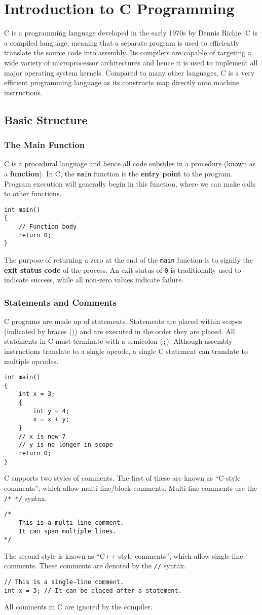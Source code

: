 \documentclass{article}
\begin{document}
\section{Introduction to C Programming}
C is a programming language developed in the early 1970s by Dennis
Richie. C is a compiled language, meaning that a separate program is
used to efficiently translate the source code into assembly. Its
compilers are capable of targeting a wide variety of microprocessor
architectures and hence it is used to implement all major operating
system kernels. Compared to many other languages, C is a very efficient
programming language as its constructs map directly onto machine
instructions.
\subsection{Basic Structure}
\subsubsection{The Main Function}
C is a procedural language and hence all code subsides in a procedure
(known as a \textbf{function}). In C, the \texttt{main} function
is the \textbf{entry point} to the program. Program execution will
generally begin in this function, where we can make calls to other
functions.
\begin{verbatim}
int main()
{
    // Function body
    return 0;
}
\end{verbatim}
The purpose of returning a zero at the end of the \texttt{main}
function is to signify the \textbf{exit status code} of the process. An
exit status of \texttt{0} is traditionally used to indicate
success, while all non-zero values indicate failure.
\subsubsection{Statements and Comments}
C programs are made up of statements. Statements are placed within
scopes (indicated by braces (\texttt{{}})) and are executed in
the order they are placed. All statements in C must terminate with a
semicolon (\texttt{;}). Although assembly instructions translate
to a single opcode, a single C statement can translate to multiple
opcodes.
\begin{verbatim}
int main()
{
    int x = 3;
    {
        int y = 4;
        x = x + y;
    }
    // x is now 7
    // y is no longer in scope
    return 0;
}
\end{verbatim}
C supports two styles of comments. The first of these are known as
``C-style comments'', which allow multi-line/block comments. Multi-line
comments use the \texttt{/* */} syntax.
\begin{verbatim}
/*
    This is a multi-line comment.
    It can span multiple lines.
*/
\end{verbatim}
The second style is known as ``C++-style comments'', which allow
single-line comments. These comments are denoted by the
\texttt{//} syntax.
\begin{verbatim}
// This is a single-line comment.
int x = 3; // It can be placed after a statement.
\end{verbatim}
All comments in C are ignored by the compiler.
\end{document}

